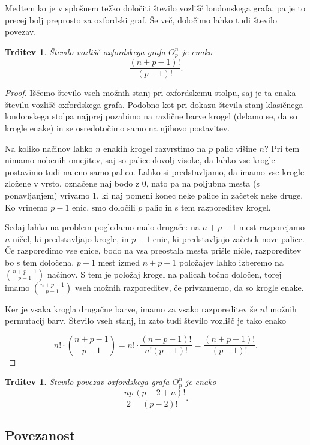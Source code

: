 \documentclass[12pt,a4paper]{amsart}
\theoremstyle{definition} %
\theoremstyle{plain} %
\newtheorem{trditev}[definicija]{Trditev}
\begin{document}
Medtem ko je v splošnem težko določiti število vozlišč londonskega grafa, pa je to precej bolj preprosto za oxfordski graf. Še več, določimo lahko tudi število povezav.

\begin{trditev}
    Število vozlišč oxfordskega grafa $O^n_p$ je enako \[\frac{(n+p-1)!}{(p-1)!}.\]
\end{trditev}

\begin{proof}
    Iščemo število vseh možnih stanj pri oxfordskemu stolpu, saj je ta enaka številu vozlišč oxfordskega grafa.
    Podobno kot pri dokazu števila stanj klasičnega londonskega stolpa najprej pozabimo na različne barve krogel (delamo se, da so krogle enake) in se osredotočimo samo na njihovo postavitev. 
    
    Na koliko načinov lahko $n$ enakih krogel razvrstimo na $p$ palic višine $n$? Pri tem nimamo nobenih omejitev, saj so palice dovolj visoke, da lahko vse krogle postavimo tudi na eno samo palico. Lahko si predstavljamo, da imamo vse krogle zložene v vrsto, označene naj bodo z 0, nato pa na poljubna mesta (s ponavljanjem) vrivamo 1, ki naj pomeni konec neke palice in začetek neke druge. Ko vrinemo $p-1$ enic, smo določili $p$ palic in s tem razporeditev krogel. 
    
    Sedaj lahko na problem pogledamo malo drugače: na $n+p-1$ mest razporejamo $n$ ničel, ki predstavljajo krogle, in $p-1$ enic, ki predstavljajo začetek nove palice. Če razporedimo vse enice, bodo na vsa preostala mesta prišle ničle, razporeditev bo s tem določena. $p-1$ mest izmed $n+p-1$ položajev lahko izberemo na ${n+p-1 \choose p-1}$ načinov. S tem je položaj krogel na palicah točno določen, torej imamo ${n+p-1 \choose p-1}$ vseh možnih razporeditev, če privzamemo, da so krogle enake. 
    
    Ker je vsaka krogla drugačne barve, imamo za vsako razporeditev še $n!$ možnih permutacij barv. Število vseh stanj, in zato tudi število vozlišč je tako enako
    
    \[ n! \cdot {n+p-1 \choose p-1} = n! \cdot \frac{(n+p-1)!}{n!(p-1)!} = \frac{(n+p-1)!}{(p-1)!}. \] \qedhere
\end{proof}

\begin{trditev}
    Število povezav oxfordskega grafa $O^n_p$ je enako
    \[ \frac{np}{2} \frac{(p-2+n)!}{(p-2)!} .\]
\end{trditev}

\subsection{Povezanost}
\end{document}
